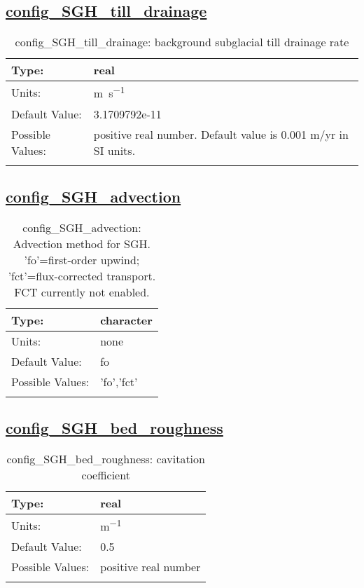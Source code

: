 \subsection[config\_SGH\_till\_drainage]{\hyperref[sec:nm_tab_subglacial_hydro]{config\_SGH\_till\_drainage}}
\label{subsec:nm_sec_config_SGH_till_drainage}
\begin{center}
\begin{longtable}{| p{2.0in} || p{4.0in} |}
    \hline
    Type: & real \\
    \hline
    Units: & \si{m.s^{-1}} \\
    \hline
    Default Value: & 3.1709792e-11 \\
    \hline
    Possible Values: & positive real number.  Default value is 0.001 m/yr in SI units. \\
    \hline
    \caption{config\_SGH\_till\_drainage: background subglacial till drainage rate}
\end{longtable}
\end{center}
\subsection[config\_SGH\_advection]{\hyperref[sec:nm_tab_subglacial_hydro]{config\_SGH\_advection}}
\label{subsec:nm_sec_config_SGH_advection}
\begin{center}
\begin{longtable}{| p{2.0in} || p{4.0in} |}
    \hline
    Type: & character \\
    \hline
    Units: & \si{none} \\
    \hline
    Default Value: & fo \\
    \hline
    Possible Values: & 'fo','fct' \\
    \hline
    \caption{config\_SGH\_advection: Advection method for SGH. 'fo'=first-order upwind; 'fct'=flux-corrected transport. FCT currently not enabled.}
\end{longtable}
\end{center}
\subsection[config\_SGH\_bed\_roughness]{\hyperref[sec:nm_tab_subglacial_hydro]{config\_SGH\_bed\_roughness}}
\label{subsec:nm_sec_config_SGH_bed_roughness}
\begin{center}
\begin{longtable}{| p{2.0in} || p{4.0in} |}
    \hline
    Type: & real \\
    \hline
    Units: & \si{m^{-1}} \\
    \hline
    Default Value: & 0.5 \\
    \hline
    Possible Values: & positive real number \\
    \hline
    \caption{config\_SGH\_bed\_roughness: cavitation coefficient}
\end{longtable}
\end{center}
